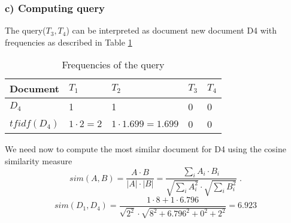 \documentclass[11pt]{article}
\begin{document}
\subsubsection*{c) Computing query}
The query($T_3, T_4$) can be interpreted as document new document D4 with frequencies
as described in Table \ref{D4}
\begin{table}[h]
\center
\begin{tabular}{|l|l|l|l|l|}
\hline
	Document & $T_1$ & $T_2$ & $T_3$ & $T_4$ \\ 
\hline
	$D_4$ & 1 & 1 & 0 & 0 \\ 
\hline
	$tfidf(D_4)$ & $1 \cdot 2 = 2$ & $1 \cdot 1.699 = 1.699$ & 0 & 0 \\ 
\hline
\end{tabular}
\caption{Frequencies of the query}
\label{D4}
\end{table}
We need now to compute the most similar document for D4 using the cosine similarity measure
\begin{equation}
	sim(A,B) = \frac{A \cdot B}{|A| \cdot |B|} = \frac{\sum_i A_i \cdot B_i}{\sqrt{\sum_i A_i^2} \cdot \sqrt{\sum_i B_i^2}} \; . 
\end{equation}
\begin{equation}
	sim(D_1, D_4) = \frac{1 \cdot 8 + 1 \cdot 6.796}
					{\sqrt{2^2} \cdot \sqrt{8^2 + 6.796^2 + 0^2 + 2^2}} = 6.923
\end{equation}
\end{document}
